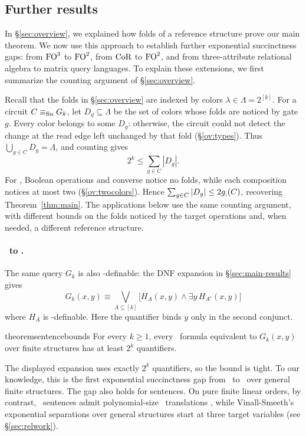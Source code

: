 \subsection{Further results}\label{sec:additional-results}
In \S\ref{sec:overview}, we explained how folds of a reference structure
prove our main theorem. We now use this approach to establish further
exponential succinctness gaps: from $\mathrm{FO}^{3}$ to $\mathrm{FO}^{2}$, from
$\mathrm{CoR}$ to $\mathrm{FO}^{2}$, and from three-attribute relational algebra to
matrix query languages. To explain these extensions, we first summarize
the counting argument of \S\ref{sec:overview}.

Recall that the folds in \S\ref{sec:overview} are indexed by colors
$\lambda\in\Lambda=2^{[k]}$. For a circuit $C\equiv_{\mathrm{fin}} G_k$, let
$D_g\subseteq\Lambda$ be the set of colors whose folds are noticed by
gate $g$. Every color belongs to some $D_g$: otherwise, the circuit
could not detect the change at the read edge left unchanged by that
fold (\S\ref{ov:types}). Thus $\bigcup_{g\in C}D_g=\Lambda$, and
counting gives
\begin{equation}\tag{$\dagger$}\label{eq:fold-counting}
  2^k\le \sum_{g\in C}|D_g|.
\end{equation}
For \CoR, Boolean operations and converse notice no folds, while each
composition notices at most two (\S\ref{ov:twocolors}). Hence
$\sum_{g\in C}|D_g|\le 2g_{;}(C)$, recovering Theorem~\ref{thm:main}.
The applications below use the same counting argument, with different
bounds on the folds noticed by the target operations and, when needed,
a different reference structure.

\paragraph{\texorpdfstring{{\boldmath\FOthree\ to \FOtwo}}{FO3 to FO2}.}
The same query $G_k$ is also \FOtwo-definable: the DNF expansion in
\S\ref{sec:main-results} gives
\[
 G_k(x,y)\equiv\bigvee_{A\subseteq[k]}
 \bigl[H_A(x,y)\land\exists y\,H_{A^c}(x,y)\bigr]
\]
where $H_A$ is \FOtwo-definable.
Here the quantifier binds $y$ only in the second conjunct.
\begin{restatable}{theorem}{sentencebounds}\label{cor:sentences}
For every $k\ge1$, every \FOtwo\ formula equivalent to $G_k(x,y)$
over finite structures has at least $2^k$ quantifiers.
\end{restatable}
The displayed expansion uses exactly $2^k$ quantifiers, so the bound
is tight. To our knowledge, this is the first exponential succinctness
gap from \FOthree\ to \FOtwo\ over general finite structures. The gap
also holds for sentences. On pure finite linear orders, by contrast,
\FOthree\ sentences admit polynomial-size \FOtwo\ translations
\citep{grohe-schweikardt2005}, while Vinall-Smeeth's exponential
separations over general structures start at three target variables
\citep{vinall-smeeth2024} (see \S\ref{sec:relwork}).

